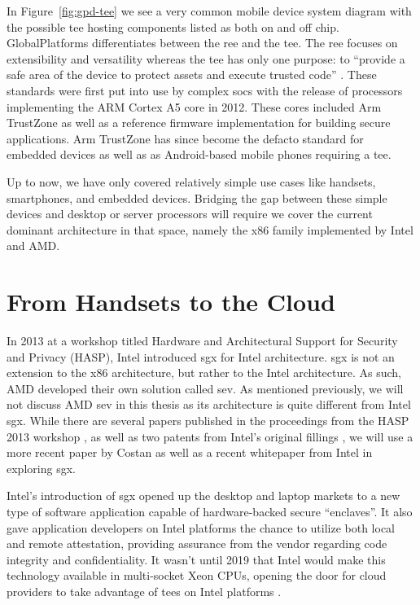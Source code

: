 In Figure~\ref{fig:gpd-tee} we see a very common mobile device system diagram with the possible \gls{tee} hosting components listed as both on and off chip. GlobalPlatforms differentiates between the \gls{ree} and the \gls{tee}. The \gls{ree} focuses on extensibility and versatility whereas the \gls{tee} has only one purpose: to ``provide a safe area of the device to protect assets and execute trusted code'' \cite{GlobalPlatform2018}.  These standards were first put into use by complex \glspl{soc} with the release of processors implementing the ARM Cortex A5 core in 2012. These cores included Arm TrustZone as well as a reference firmware implementation for building secure applications. Arm TrustZone has since become the defacto standard for embedded devices as well as as Android-based mobile phones requiring a \gls{tee}. 

Up to now, we have only covered relatively simple use cases like handsets, smartphones, and embedded devices. Bridging the gap between these simple devices and desktop or server processors will require we cover the current dominant architecture in that space, namely the x86 family implemented by Intel and AMD.

\section{From Handsets to the Cloud}
In 2013 at a workshop titled Hardware and Architectural Support for Security and Privacy (HASP), Intel introduced \gls{sgx} for Intel architecture. \gls{sgx} is not an extension to the x86 architecture, but rather to the Intel architecture. As such, AMD developed their own solution called \gls{sev}. As mentioned previously, we will not discuss AMD \gls{sev} in this thesis as its architecture is quite different from Intel \gls{sgx}. While there are several papers published in the proceedings from the HASP 2013 workshop \cite{10.1145/2487726.2488368, 10.1145/2487726.2488370, anati2013innovative}, as well as two patents from Intel's original fillings \cite{johnson2010technique, mckeen2009method}, we will use a more recent paper by Costan \cite{Costan2016} as well as a recent whitepaper from Intel \cite{johnson2016intel} in exploring \gls{sgx}.

Intel's introduction of \gls{sgx} opened up the desktop and laptop markets to a new type of software application capable of hardware-backed secure ``enclaves''. It also gave application developers on Intel platforms the chance to utilize both local and remote \gls{attestation}, providing assurance from the vendor regarding code integrity and confidentiality. It wasn't until 2019 that Intel would make this technology available in multi-socket Xeon CPUs, opening the door for cloud providers to take advantage of \glspl{tee} on Intel platforms \cite{10.1145/3337167.3337173}.

